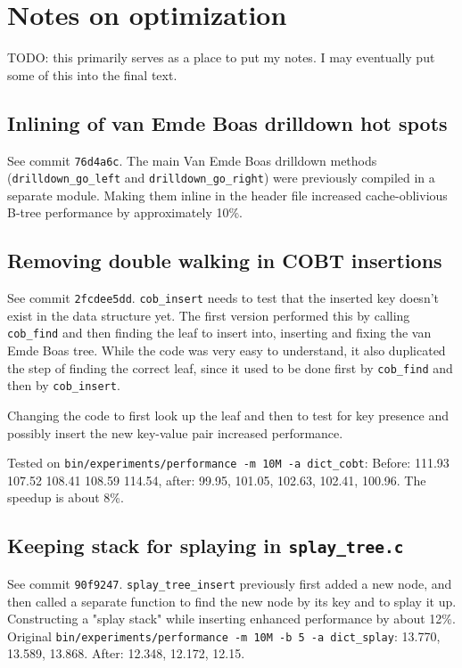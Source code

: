 \section{Notes on optimization}
TODO: this primarily serves as a place to put my notes.
I may eventually put some of this into the final text.

\subsection{Inlining of van Emde Boas drilldown hot spots}
See commit \texttt{76d4a6c}. The main Van Emde Boas drilldown
methods (\texttt{drilldown\_go\_left} and \texttt{drilldown\_go\_right})
were previously compiled in a separate module. Making them inline
in the header file increased cache-oblivious B-tree performance
by approximately 10\%.

\subsection{Removing double walking in COBT insertions}
See commit \texttt{2fcdee5dd}.
\texttt{cob\_insert} needs to test that the inserted key doesn't exist
in the data structure yet. The first version performed this by calling
\texttt{cob\_find} and then finding the leaf to insert into, inserting
and fixing the van Emde Boas tree. While the code was very easy to understand,
it also duplicated the step of finding the correct leaf, since it used
to be done first by \texttt{cob\_find} and then by \texttt{cob\_insert}.

Changing the code to first look up the leaf and then to test for key presence
and possibly insert the new key-value pair increased performance.

Tested on \texttt{bin/experiments/performance -m 10M -a dict\_cobt}:
Before: 111.93 107.52 108.41 108.59 114.54, after:
99.95, 101.05, 102.63, 102.41, 100.96.
The speedup is about 8\%.

\subsection{Keeping stack for splaying in \texttt{splay\_tree.c}}
See commit \texttt{90f9247}.
\texttt{splay\_tree\_insert} previously first added a new node, and then called
a separate function to find the new node by its key and to splay it up.
Constructing a "splay stack" while inserting enhanced performance by about 12\%.
Original \texttt{bin/experiments/performance -m 10M -b 5 -a dict\_splay}:
13.770, 13.589, 13.868. After: 12.348, 12.172, 12.15.
